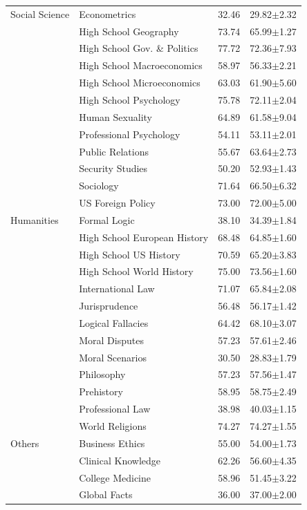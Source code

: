 {\begin{longtable}{@{}l>{\raggedright\arraybackslash}p{3.6cm}cc@{}}
Social Science & Econometrics & 32.46 & 29.82$\pm$2.32 \\
 & High School Geography & 73.74 & 65.99$\pm$1.27 \\
 & High School Gov. \& Politics & 77.72 & 72.36$\pm$7.93 \\
 & High School Macroeconomics & 58.97 & 56.33$\pm$2.21 \\
 & High School Microeconomics & 63.03 & 61.90$\pm$5.60 \\
 & High School Psychology & 75.78 & 72.11$\pm$2.04 \\
 & Human Sexuality & 64.89 & 61.58$\pm$9.04 \\
 & Professional Psychology & 54.11 & 53.11$\pm$2.01 \\
 & Public Relations & 55.67 & 63.64$\pm$2.73 \\
 & Security Studies & 50.20 & 52.93$\pm$1.43 \\
 & Sociology & 71.64 & 66.50$\pm$6.32 \\
 & US Foreign Policy & 73.00 & 72.00$\pm$5.00 \\ \midrule
Humanities & Formal Logic & 38.10 & 34.39$\pm$1.84 \\
 & High School European History & 68.48 & 64.85$\pm$1.60 \\
 & High School US History & 70.59 & 65.20$\pm$3.83 \\
 & High School World History & 75.00 & 73.56$\pm$1.60 \\
 & International Law & 71.07 & 65.84$\pm$2.08 \\
 & Jurisprudence & 56.48 & 56.17$\pm$1.42 \\
 & Logical Fallacies & 64.42 & 68.10$\pm$3.07 \\
 & Moral Disputes & 57.23 & 57.61$\pm$2.46 \\
 & Moral Scenarios & 30.50 & 28.83$\pm$1.79 \\
 & Philosophy & 57.23 & 57.56$\pm$1.47 \\
 & Prehistory & 58.95 & 58.75$\pm$2.49 \\
 & Professional Law & 38.98 & 40.03$\pm$1.15 \\
 & World Religions & 74.27 & 74.27$\pm$1.55 \\ \midrule
Others & Business Ethics & 55.00 & 54.00$\pm$1.73 \\
 & Clinical Knowledge & 62.26 & 56.60$\pm$4.35 \\
 & College Medicine & 58.96 & 51.45$\pm$3.22 \\
 & Global Facts & 36.00 & 37.00$\pm$2.00 \\

\end{longtable}}
